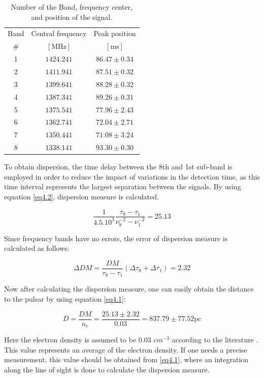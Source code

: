 \documentclass[12pt]{article}
\begin{document}
\begin{table}
\centering
\caption{Number of the Band, frequency center, and position of the signal.}
\label{T4.1}
\begin{tabular}{c | c| c}
\hline
\hline
Band & Central frequency & Peak position\\
\#&$[\mathrm{MHz}]$&$[\mathrm{ms}]$\\
\hline
\hline
1&$1424.241$&$86.47 \pm 0.34$\\
2&$1411.941$&$87.51 \pm 0.32$\\
3&$1399.641$&$88.28 \pm 0.32$\\
4&$1387.341$&$89.26 \pm 0.31$\\
5&$1375.541$&$77.96 \pm 2.43$\\
6&$1362.741$&$72.04 \pm 2.71$\\
7&$1350.441$&$71.08 \pm 3.24$\\
8&$1338.141$&$93.30 \pm 0.30$
\end{tabular}
\end{table}
  

To obtain dispersion, the time delay between the 8th and 1st sub-band is employed in order to reduce the impact of variations in the detection time, as this time interval represents the largest separation between the signals.  By using equation \ref{eq4.2}, dispersion measure is calculated.

\begin{equation}
\dfrac{1}{4.5 . 10^3}\dfrac{\tau_8 - \tau_1}{\nu_8^{-2}-\nu_1^{-2}}  = 25.13 
\label{eq4.7}
\end{equation}

Since frequency bands have no errors, the error of dispersion measure is calculated as follows:

\begin{equation}
\Delta DM = \dfrac{DM}{\tau_8 - \tau_1} (\Delta \tau_8 + \Delta \tau_1) = 2.32
\label{eq4.8}
\end{equation}

Now after calculating the dispersion measure, one can easily obtain the distance to the pulsar by using equation \ref{eq4.1}:

\begin{equation}
D = \dfrac{DM}{n_e} = \dfrac{25.13 \pm 2.32}{0.03} = 837.79 \pm 77.52 \mathrm{pc}
\end{equation}

Here the electron density is assumed to be 0.03 $cm^{-3}$ according to the literature \cite{refId0}. This value represents an average of the electron density. If one needs a precise measurement, this value should be obtained from \ref{eq4.1}, where an integration along the line of sight is done to calculate the dispersion measure.
\end{document}
